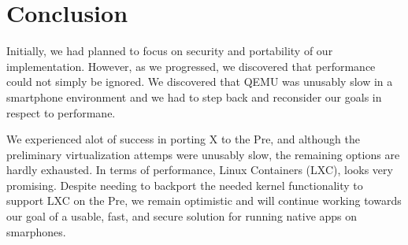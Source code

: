 \section{Conclusion}
\label{sec:conclusion}
Initially, we had planned to focus on security and portability of our implementation.  However, as we progressed, we discovered that performance could not simply be ignored.  We discovered that QEMU was unusably slow in a smartphone environment and we had to step back and reconsider our goals in respect to performane.

We experienced alot of success in porting X to the Pre, and although the preliminary virtualization attemps were unusably slow, the remaining options are hardly exhausted.  In terms of performance, Linux Containers (LXC), looks very promising.  Despite needing to backport the needed kernel functionality to support LXC on the Pre, we remain optimistic and will continue working towards our goal of a usable, fast, and secure solution for running native apps on smarphones.  

